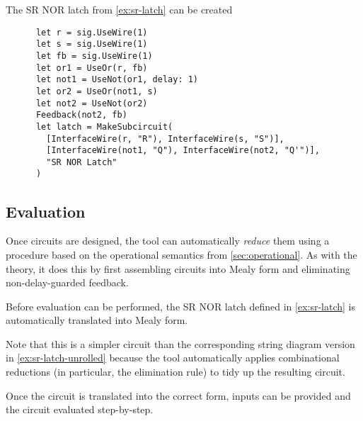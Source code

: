 \begin{example}\label{ex:sr-latch-hdl}
  The SR NOR latch from \cref{ex:sr-latch} can be created
  \begin{lstlisting}
      let r = sig.UseWire(1)
      let s = sig.UseWire(1)
      let fb = sig.UseWire(1)
      let or1 = UseOr(r, fb)
      let not1 = UseNot(or1, delay: 1)
      let or2 = UseOr(not1, s)
      let not2 = UseNot(or2)
      Feedback(not2, fb)
      let latch = MakeSubcircuit(
        [InterfaceWire(r, "R"), InterfaceWire(s, "S")],
        [InterfaceWire(not1, "Q"), InterfaceWire(not2, "Q'")],
        "SR NOR Latch"
      )
    \end{lstlisting}
  \begin{center}
    \scalebox{0.3}{}
  \end{center}
\end{example}

\subsection{Evaluation}

Once circuits are designed, the tool can automatically \emph{reduce} them
using a procedure based on the operational semantics from
\cref{sec:operational}.
As with the theory, it does this by first assembling circuits into Mealy form
and eliminating non-delay-guarded feedback.

\begin{example}
  Before evaluation can be performed, the SR NOR latch defined in
  \cref{ex:sr-latch} is automatically translated into Mealy form.
  \begin{center}
    \scalebox{0.25}{}
  \end{center}
  Note that this is a simpler circuit than the corresponding string diagram
  version in \cref{ex:sr-latch-unrolled} because the tool automatically
  applies combinational reductions (in particular, the elimination rule) to
  tidy up the resulting circuit.
\end{example}

Once the circuit is translated into the correct form, inputs can be provided
and the circuit evaluated step-by-step.

